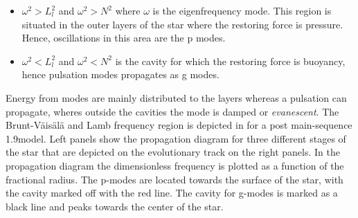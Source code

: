 \begin{itemize}
    \item $\omega^2 > L_l^2$ and $\omega^2 > N^2$ where $\omega$ is the eigenfrequency mode. This region is situated in the outer layers of the star where the restoring force is pressure. Hence, oscillations in this area are the p modes. 
    \item $\omega^2 < L^2_l$ and $\omega^2 < N^2$ is the cavity for which the restoring force is buoyancy, hence pulsation modes propagates as g modes. 
\end{itemize}

Energy from modes are mainly distributed to the layers whereas a pulsation can propagate, wheres outside the cavities the mode is damped or \textit{evanescent}. The Brunt-Väisälä and Lamb frequency region is depicted in  for a post main-sequence 1.9\msun model. Left panels show the propagation diagram for three different stages of the star that are depicted on the evolutionary track on the right panels. In the propagation diagram the dimensionless frequency is plotted as a function of the fractional radius. The p-modes are located towards the surface of the star, with the cavity marked off with the red line. The cavity for g-modes is marked as a black line and peaks towards the center of the star.
